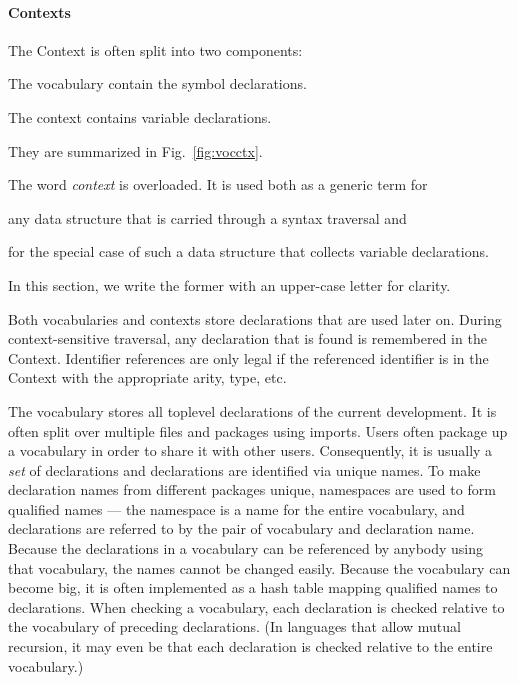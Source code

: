 \paragraph{Contexts}
The Context is often split into two components:
\begin{compactitem}
\item The vocabulary contain the symbol declarations.
\item The context contains variable declarations.
\end{compactitem}
They are summarized in Fig.~\ref{fig:vocctx}.

\begin{terminology}
The word \emph{context} is overloaded.
It is used both as a generic term for
\begin{compactitem}
\item any data structure that is carried through a syntax traversal and
\item for the special case of such a data structure that collects variable declarations.
\end{compactitem}
In this section, we write the former with an upper-case letter for clarity.
\end{terminology}

Both vocabularies and contexts store declarations that are used later on.
During context-sensitive traversal, any declaration that is found is remembered in the Context.
Identifier references are only legal if the referenced identifier is in the Context with the appropriate arity, type, etc.

The vocabulary stores all toplevel declarations of the current development.
It is often split over multiple files and packages using imports.
Users often package up a vocabulary in order to share it with other users.
Consequently, it is usually a \emph{set} of declarations and declarations are identified via unique names.
To make declaration names from different packages unique, namespaces are used to form qualified names --- the namespace is a name for the entire vocabulary, and declarations are referred to by the pair of vocabulary and declaration name.
Because the declarations in a vocabulary can be referenced by anybody using that vocabulary, the names cannot be changed easily.
Because the vocabulary can become big, it is often implemented as a hash table mapping qualified names to declarations.
When checking a vocabulary, each declaration is checked relative to the vocabulary of preceding declarations. (In languages that allow mutual recursion, it may even be that each declaration is checked relative to the entire vocabulary.)

